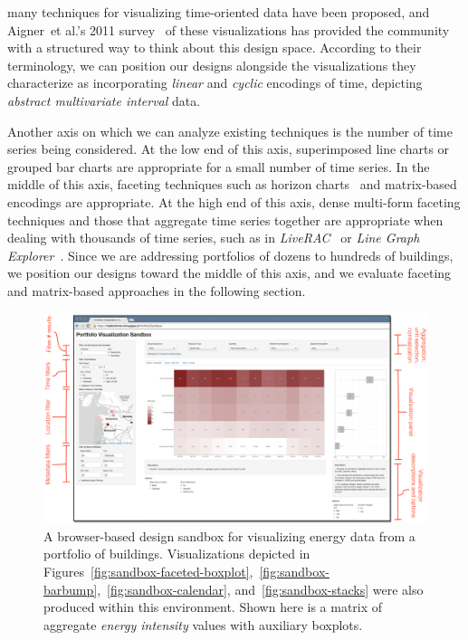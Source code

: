 \documentclass[journal]{vgtc}                %
\newcommand{\bstart}[1]{\vspace{1mm} \noindent{\textbf{#1:}}}
\newcommand{\etal}{et al.}
\begin{document}
\bstart{Visualizing multiple time series} many techniques for visualizing time-oriented data have been proposed, and Aigner~\etal's 2011 survey~\cite{Aigner2011} of these visualizations has provided the community with a structured way to think about this design space.
According to their terminology, we can position our designs alongside the visualizations they characterize as incorporating {\it linear} and {\it cyclic} encodings of time, depicting {\it abstract multivariate interval} data.

Another axis on which we can analyze existing techniques is the number of time series being considered.
At the low end of this axis, superimposed line charts or grouped bar charts are appropriate for a small number of time series. 
In the middle of this axis, faceting techniques such as horizon charts~\cite{Heer2009} and matrix-based encodings are appropriate.
At the high end of this axis, dense multi-form faceting techniques and those that aggregate time series together are appropriate when dealing with thousands of time series, such as in {\it LiveRAC}~\cite{McLachlan2008} or {\it Line Graph Explorer}~\cite{Lam2007}. 
Since we are addressing portfolios of dozens to hundreds of buildings, we position our designs toward the middle of this axis, and we evaluate faceting and matrix-based approaches in the following section.

\begin{figure}[hbp!]
    \vspace{-0.6cm}
	\centering
	\includegraphics[width=\textwidth]{figures/sandbox.pdf}
	\vspace{-0.6cm}
	\caption{A browser-based design sandbox for visualizing energy data from a portfolio of buildings. Visualizations depicted in Figures~\ref{fig:sandbox-faceted-boxplot},~\ref{fig:sandbox-barbump},~\ref{fig:sandbox-calendar}, and~\ref{fig:sandbox-stacks} were also produced within this environment. Shown here is a matrix of aggregate \textsl{energy intensity} values with auxiliary boxplots.}
	\label{fig:sandbox}
\end{figure} 
\end{document}
